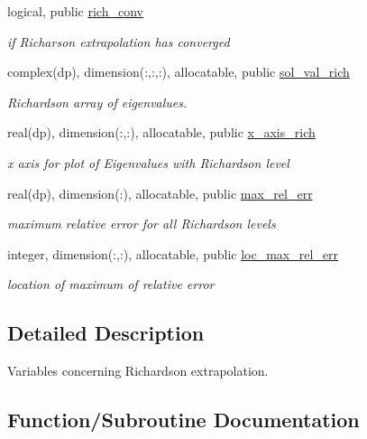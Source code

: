 \begin{DoxyCompactItemize}
logical, public \hyperlink{namespacerich__vars_adf63efd509bbcda4f77fd7e88c766081}{rich\+\_\+conv}
\begin{DoxyCompactList}\small\item\em if Richarson extrapolation has converged \end{DoxyCompactList}\item 
complex(dp), dimension(\+:,\+:,\+:), allocatable, public \hyperlink{namespacerich__vars_ae1d3c7deb4c8becd036a63367fca5e20}{sol\+\_\+val\+\_\+rich}
\begin{DoxyCompactList}\small\item\em Richardson array of eigenvalues. \end{DoxyCompactList}\item 
real(dp), dimension(\+:,\+:), allocatable, public \hyperlink{namespacerich__vars_a7f584d9b84f3e3e230b45ce4b8e0e9b1}{x\+\_\+axis\+\_\+rich}
\begin{DoxyCompactList}\small\item\em x axis for plot of Eigenvalues with Richardson level \end{DoxyCompactList}\item 
real(dp), dimension(\+:), allocatable, public \hyperlink{namespacerich__vars_afac4d06d60829484cfb7d4964964945b}{max\+\_\+rel\+\_\+err}
\begin{DoxyCompactList}\small\item\em maximum relative error for all Richardson levels \end{DoxyCompactList}\item 
integer, dimension(\+:,\+:), allocatable, public \hyperlink{namespacerich__vars_af3df7361e33058bc83fe43a803173d89}{loc\+\_\+max\+\_\+rel\+\_\+err}
\begin{DoxyCompactList}\small\item\em location of maximum of relative error \end{DoxyCompactList}\end{DoxyCompactItemize}


\subsection{Detailed Description}
Variables concerning Richardson extrapolation. 

\subsection{Function/\+Subroutine Documentation}
\mbox{\label{namespacerich__vars_a4f54d3fc0ac510fc073220794ee4fa37}} 
